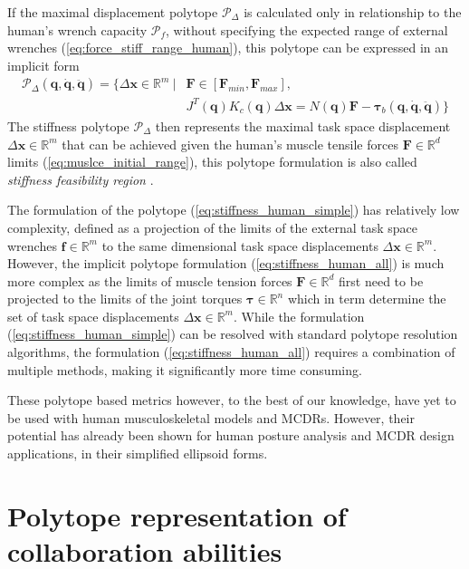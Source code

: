 If the maximal displacement polytope $\mathcal{P}_\Delta$ is calculated only in relationship to the human's wrench capacity $\mathcal{P}_f$, without specifying the expected range of external wrenches (\ref{eq:force_stiff_range_human}), this polytope can be expressed in an implicit form
\begin{equation}
\begin{split}
    \mathcal{P}_\Delta(\bm{q},\dot{\bm{q}},\ddot{\bm{q}}) =\! \{ \Delta\bm{x} \in \mathbb{R}^m ~|&\bm{F}\in\left[\bm{F}_{min}, \bm{F}_{max} \right]\!,\\ ~ &J^T(\bm{q})K_c(\bm{q})\Delta\bm{x}\!= N(\bm{q})\bm{F}\! -\! \bm{\tau}_b(\bm{q},\dot{\bm{q}},\ddot{\bm{q}}) \}\label{eq:stiffness_human_all}
\end{split}
\end{equation}
The stiffness polytope $\mathcal{P}_\Delta$ then represents the maximal task space displacement $\Delta \bm{x} \in \mathbb{R}^m$ that can be achieved given the human's muscle tensile forces $\bm{F} \in \mathbb{R}^d$ limits (\ref{eq:muslce_initial_range}), this polytope formulation is also called \textit{stiffness feasibility region} \cite{ajoudani2017choosing}.

The formulation of the polytope (\ref{eq:stiffness_human_simple}) has relatively low complexity, defined as a projection of the limits of the external task space wrenches $\bm{f} \in \mathbb{R}^m$ to the same dimensional task space displacements $\Delta \bm{x} \in \mathbb{R}^m$. However, the implicit polytope formulation (\ref{eq:stiffness_human_all}) is much more complex as the limits of muscle tension forces $\bm{F} \in \mathbb{R}^d$ first need to be projected to the limits of the joint torques $\bm{\tau} \in \mathbb{R}^n$ which in term determine the set of task space displacements $\Delta \bm{x} \in \mathbb{R}^m$. While the formulation  (\ref{eq:stiffness_human_simple}) can be resolved with standard polytope resolution algorithms, the formulation (\ref{eq:stiffness_human_all}) requires a combination of multiple methods, making it significantly more time consuming. 

These polytope based metrics however, to the best of our knowledge, have yet to be used with human musculoskeletal models and MCDRs. However, their potential has already been shown for human posture analysis \cite{Inouye2016} and MCDR design \cite{Ramadoss2021} applications, in their simplified ellipsoid forms.

\section{Polytope representation of collaboration abilities}
\label{ch:collab_metrics}

